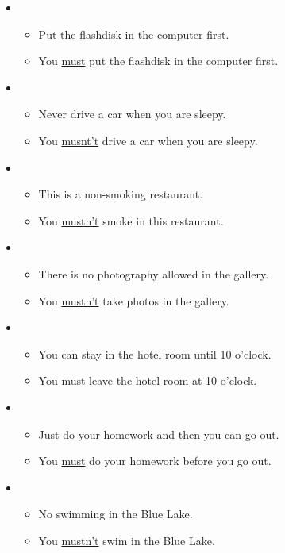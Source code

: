 \begin{itemize}

\item
\begin{itemize}
\item Put the flashdisk in the computer first.
\item You \underline{must} put the flashdisk in the computer first. 
\end{itemize}

\item
\begin{itemize}
\item Never drive a car when you are sleepy.
\item You \underline{musnt't} drive a car when you are sleepy.
\end{itemize}

\item
\begin{itemize}
\item This is a non-smoking restaurant.
\item You \underline{mustn't} smoke in this restaurant.
\end{itemize}

\item
\begin{itemize}
\item There is no photography allowed in the gallery. 
\item You \underline{mustn't} take photos in the gallery.
\end{itemize}

\item
\begin{itemize}
\item You can stay in the hotel room until 10 o'clock. 
\item You \underline{must} leave the hotel room at 10 o'clock. 
\end{itemize}

\item
\begin{itemize}
\item Just do your homework and then you can go out. 
\item You \underline{must} do your homework before you go out.
\end{itemize}

\item
\begin{itemize}
\item No swimming in the Blue Lake. 
\item You \underline{mustn't} swim in the Blue Lake.
\end{itemize}


\end{itemize}

